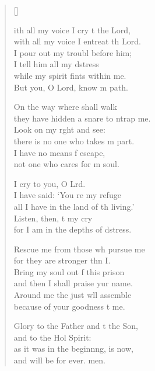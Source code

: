 \settowidth{\versewidth}{With all my voice I cry to the Lord, *}
\begin{verse}[\versewidth]
  \begin{patverse}
ith all my voice I cry t the Lord,\Med\\
    with all my voice I entreat th Lord.\\
I pour out my troubl before him;\Med\\
    I tell him all my d\pointup{\i}stress\\
while my spirit fints within me.\Med\\
    But you, O Lord, know m path.

On the way where  shall walk\Med\\
    they have hidden a snare to ntrap me.\\
Look on my r\pointup{\i}ght and see:\Med\\
    there is no one who takes m part.\\
I have no means f escape,\Med\\
    not one who cares for m soul.

I cry to you, O Lrd.\Flex\\
    I have said: ‘You re my refuge\Med\\
    all I have in the land of th living.’\\
Listen, then, t my cry\Med\\
    for I am in the depths of d\pointup{\i}stress.

Rescue me from those wh pursue me\Med\\
    for they are stronger thn I.\\
Bring my soul out f this prison\Med\\
    and then I shall praise yur name.\\
Around me the just w\pointup{\i}ll assemble\Med\\
    because of your goodness t me.

Glory to the Father and t the Son,\Med\\
    and to the Hol Spirit:\\
as it was in the beginn\pointup{\i}ng, is now,\Med\\
    and will be for ever. men.
  \end{patverse}
\end{verse}
